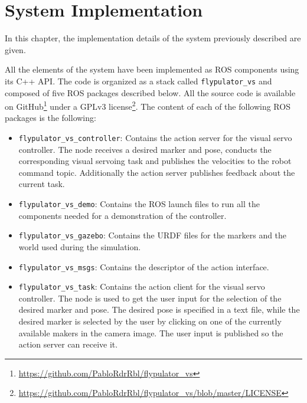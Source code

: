 
\chapter{System Implementation}
\label{chap:implementation}

In this chapter, the implementation details of the system previously described are given.

All the elements of the system have been implemented as ROS components using its C++ API. The code is organized as a stack called \texttt{flypulator\_vs} and composed of five ROS packages described below. All the source code is available on GitHub\footnote{\url{https://github.com/PabloRdrRbl/flypulator_vs}} under a GPLv3 license\footnote{\url{https://github.com/PabloRdrRbl/flypulator_vs/blob/master/LICENSE}}. The content of each of the following ROS packages is the following:


\begin{itemize}
	\item \texttt{flypulator\_vs\_controller}: Contains the action server for the visual servo controller. The node receives a desired marker and pose, conducts the corresponding visual servoing task and publishes the velocities to the robot command topic. Additionally the action server publishes feedback about the current task.
	
	\item \texttt{flypulator\_vs\_demo}: Contains the ROS launch files to run all the components needed for a demonstration of the controller.
	
	\item \texttt{flypulator\_vs\_gazebo}: Contains the URDF files for the markers and the world used during the simulation.
	
	\item \texttt{flypulator\_vs\_msgs}: Contains the descriptor of the action interface.
	
	\item \texttt{flypulator\_vs\_task}: Contains the action client for the visual servo controller. The node is used to get the user input for the selection of the desired marker and pose. The desired pose is specified in a text file, while the desired marker is selected by the user by clicking on one of the currently available makers in the camera image. The user input is published so the action server can receive it.
\end{itemize}

